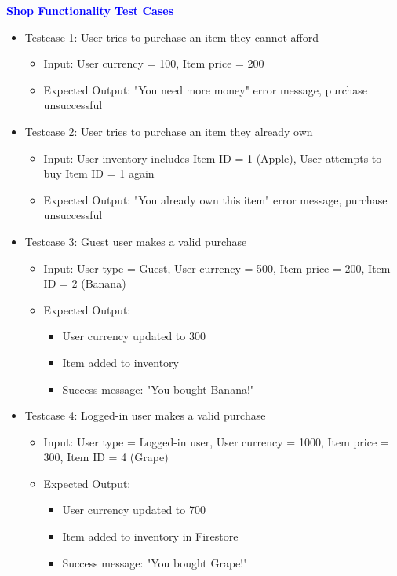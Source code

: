 \noindent
\textbf{\textcolor{blue}{Shop Functionality Test Cases}}
\begin{itemize}
    \item Testcase 1: User tries to purchase an item they cannot afford
    \begin{itemize}
        \item Input: User currency = 100, Item price = 200
        \item Expected Output: "You need more money" error message, purchase unsuccessful
    \end{itemize}

    \item Testcase 2: User tries to purchase an item they already own
    \begin{itemize}
        \item Input: User inventory includes Item ID = 1 (Apple), User attempts to buy Item ID = 1 again
        \item Expected Output: "You already own this item" error message, purchase unsuccessful
    \end{itemize}

    \item Testcase 3: Guest user makes a valid purchase
    \begin{itemize}
        \item Input: User type = Guest, User currency = 500, Item price = 200, Item ID = 2 (Banana)
        \item Expected Output:
        \begin{itemize}
            \item User currency updated to 300
            \item Item added to inventory
            \item Success message: "You bought Banana!"
        \end{itemize}
    \end{itemize}

    \item Testcase 4: Logged-in user makes a valid purchase
    \begin{itemize}
        \item Input: User type = Logged-in user, User currency = 1000, Item price = 300, Item ID = 4 (Grape)
        \item Expected Output:
        \begin{itemize}
            \item User currency updated to 700
            \item Item added to inventory in Firestore
            \item Success message: "You bought Grape!"
        \end{itemize}
    \end{itemize}


\end{itemize}
